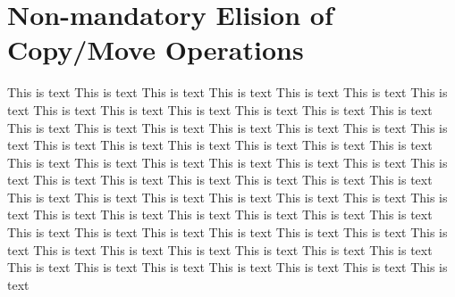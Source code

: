 \documentclass[a4paper]{uestcreport}
\begin{document}
\section{Non-mandatory Elision of Copy/Move Operations}
This is text This is text This is text This is text This is text This is text This is text This is text This is text This is text This is text This is text This is text This is text This is text This is text This is text This is text This is text This is text This is text This is text This is text This is text This is text This is text This is text This is text This is text This is text This is text This is text This is text This is text This is text This is text This is text This is text This is text This is text This is text This is text This is text This is text This is text This is text This is text This is text This is text This is text This is text This is text This is text This is text This is text This is text This is text This is text This is text This is text This is text This is text This is text This is text This is text This is text This is text This is text This is text This is text This is text This is text 
\end{document}

